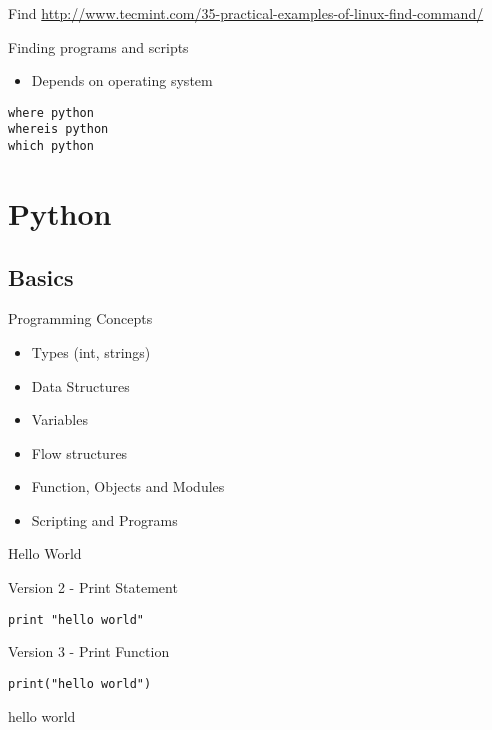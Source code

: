 \documentclass[presentation]{beamer}
\begin{document}
\begin{frame}[label=sec-3-0-7]{Find}
\url{http://www.tecmint.com/35-practical-examples-of-linux-find-command/}
\end{frame}


\begin{frame}[fragile,label=sec-3-0-8]{Finding programs and scripts}
 \begin{itemize}
\item Depends on operating system
\end{itemize}

\lstset{numbers=left,language=sh,label= ,caption= }
\begin{lstlisting}
where python
whereis python
which python
\end{lstlisting}
\end{frame}


\section{Python}
\label{sec-4}

\subsection{Basics}
\label{sec-4-1}

\begin{frame}[label=sec-4-1-1]{Programming Concepts}
\begin{itemize}
\item Types (int, strings)
\item Data Structures
\item Variables
\item Flow structures
\item Function, Objects and Modules
\item Scripting and Programs
\end{itemize}
\end{frame}


\begin{frame}[fragile,label=sec-4-1-2]{Hello World}
 \begin{block}{Version 2 - Print Statement}
\lstset{numbers=left,language=Python,label= ,caption= }
\begin{lstlisting}
print "hello world"
\end{lstlisting}
\end{block}

\begin{block}{Version 3 - Print Function}
\lstset{numbers=left,language=Python,label= ,caption= }
\begin{lstlisting}
print("hello world")
\end{lstlisting}
hello world
\end{block}

\end{frame}
\end{document}

